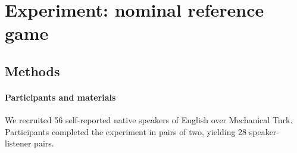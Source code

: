 \documentclass[10pt,letterpaper]{article}
\newcommand{\ndg}[1]{\textcolor{Green}{[ndg: #1]}}
\begin{document}
%



\section{Experiment: nominal reference game}




\subsection{Methods}


\paragraph{Participants and materials}
We recruited 56 self-reported native speakers of English over Mechanical Turk. Participants completed the experiment in pairs of two, yielding 28 speaker-listener pairs.
\end{document}
